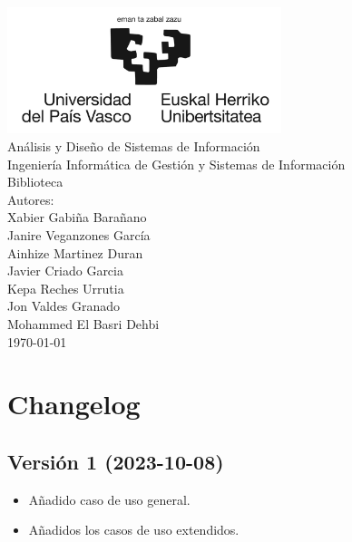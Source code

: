 ﻿\documentclass{report}
\begin{document}
    \begin{titlepage}
        \centering
        \includegraphics[width=0.6\textwidth]{./img/portada/logo.jpg}\\
        \vspace{1cm}
        \LARGE Análisis y Diseño de Sistemas de Información\\
        \vspace{0.5cm}
        \Large Ingeniería Informática de Gestión y Sistemas de Información\\
        \vspace{3cm}
        \Huge Biblioteca\\
        \vspace{2.5cm}
        \Large Autores:\\
        \vspace{0.2cm}
        \large Xabier Gabiña Barañano\\
        \large Janire Veganzones García\\
        \large Ainhize Martinez Duran\\
        \large Javier Criado Garcia\\
        \large Kepa Reches Urrutia\\
        \large Jon Valdes Granado\\
        \large Mohammed El Basri Dehbi\\
        \vfill
        \today
    \end{titlepage}

    \tableofcontents
    \chapter{Changelog}
        \section{Versión 1 (2023-10-08)}
            \begin{itemize}
                \item Añadido caso de uso general.
                \item Añadidos los casos de uso extendidos.
            \end{itemize}  
\end{document}
